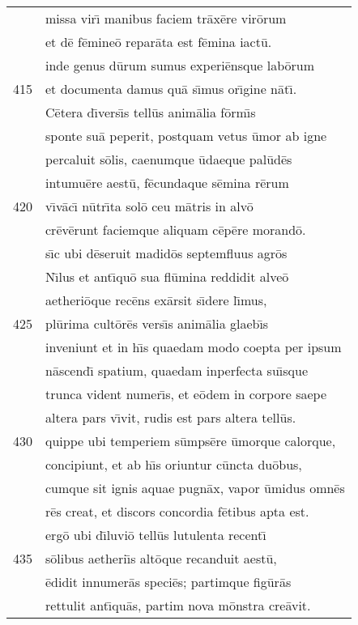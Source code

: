 \documentclass[paper=6in:9in,pagesize=pdftex,
               headinclude=on,footinclude=on,12pt]{scrbook}
\begin{document}
\begin{longtable}[p]{ r l }
 & missa vir\={\i} manibus faciem tr\=ax\=ere vir\=orum\\ 
 & et d\=e f\=emine\=o repar\=ata est f\=emina iact\=u.\\ 
 & inde genus d\=urum sumus experi\=ensque lab\=orum\\ 
415 & et documenta damus qu\=a s\={\i}mus or\={\i}gine n\=at\={\i}.\\ 
 & \indent C\=etera d\={\i}vers\={\i}s tell\=us anim\=alia f\=orm\={\i}s\\ 
 & sponte su\=a peperit, postquam vetus \=umor ab igne\\ 
 & percaluit s\=olis, caenumque \=udaeque pal\=ud\=es\\ 
 & intumu\=ere aest\=u, f\=ecundaque s\=emina r\=erum\\ 
420 & v\={\i}v\=ac\={\i} n\=utr\={\i}ta sol\=o ceu m\=atris in alv\=o\\ 
 & cr\=ev\=erunt faciemque aliquam c\=ep\=ere morand\=o.\\ 
 & s\={\i}c ubi d\=eseruit madid\=os septemfluus agr\=os\\ 
 & N\={\i}lus et ant\={\i}qu\=o sua fl\=umina reddidit alve\=o\\ 
 & aetheri\=oque rec\=ens ex\=arsit s\={\i}dere l\={\i}mus,\\ 
425 & pl\=urima cult\=or\=es vers\={\i}s anim\=alia glaeb\={\i}s\\ 
 & inveniunt et in h\={\i}s quaedam modo coepta per ipsum\\ 
 & n\=ascend\={\i} spatium, quaedam inperfecta su\={\i}sque\\ 
 & trunca vident numer\={\i}s, et e\=odem in corpore saepe\\ 
 & altera pars v\={\i}vit, rudis est pars altera tell\=us.\\ 
430 & quippe ubi temperiem s\=umps\=ere \=umorque calorque,\\ 
 & concipiunt, et ab h\={\i}s oriuntur c\=uncta du\=obus,\\ 
 & cumque sit ignis aquae pugn\=ax, vapor \=umidus omn\=es\\ 
 & r\=es creat, et discors concordia f\=etibus apta est.\\ 
 & erg\=o ubi d\={\i}luvi\=o tell\=us lutulenta recent\={\i}\\ 
435 & s\=olibus aetheri\={\i}s alt\=oque recanduit aest\=u,\\ 
 & \=edidit innumer\=as speci\=es; partimque fig\=ur\=as\\ 
 & rettulit ant\={\i}qu\=as, partim nova m\=onstra cre\=avit.\\ 

\end{longtable}
\end{document}
